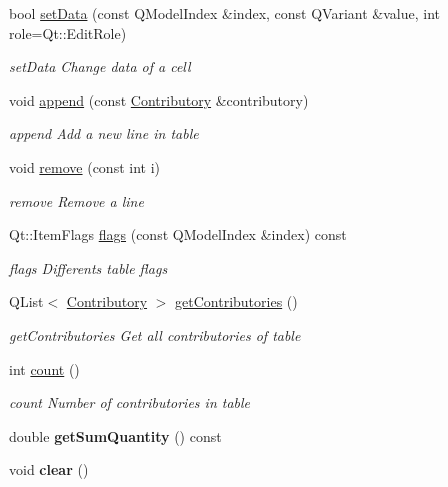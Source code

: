 \begin{DoxyCompactItemize}
bool \hyperlink{classGui_1_1Widgets_1_1WdgModels_1_1ContributoriesTableModel_a1c9f7969dc52e5840acfc122fcb2ab48}{set\-Data} (const Q\-Model\-Index \&index, const Q\-Variant \&value, int role=Qt\-::\-Edit\-Role)
\begin{DoxyCompactList}\small\item\em set\-Data Change data of a cell \end{DoxyCompactList}\item 
void \hyperlink{classGui_1_1Widgets_1_1WdgModels_1_1ContributoriesTableModel_a6d3f0ab976abd9993b731b27fbe3a404}{append} (const \hyperlink{classModels_1_1Contributory}{Contributory} \&contributory)
\begin{DoxyCompactList}\small\item\em append Add a new line in table \end{DoxyCompactList}\item 
void \hyperlink{classGui_1_1Widgets_1_1WdgModels_1_1ContributoriesTableModel_a76666bbbc940867b6ff3366424f72e26}{remove} (const int i)
\begin{DoxyCompactList}\small\item\em remove Remove a line \end{DoxyCompactList}\item 
Qt\-::\-Item\-Flags \hyperlink{classGui_1_1Widgets_1_1WdgModels_1_1ContributoriesTableModel_a6bf3e8c45bb499e82546be456a7de77b}{flags} (const Q\-Model\-Index \&index) const 
\begin{DoxyCompactList}\small\item\em flags Differents table flags \end{DoxyCompactList}\item 
Q\-List$<$ \hyperlink{classModels_1_1Contributory}{Contributory} $>$ \hyperlink{classGui_1_1Widgets_1_1WdgModels_1_1ContributoriesTableModel_af20bc21f24f7597b6b7d053d11d02d97}{get\-Contributories} ()
\begin{DoxyCompactList}\small\item\em get\-Contributories Get all contributories of table \end{DoxyCompactList}\item 
int \hyperlink{classGui_1_1Widgets_1_1WdgModels_1_1ContributoriesTableModel_acc01a97c00bb57e6733f697fc45be0ed}{count} ()
\begin{DoxyCompactList}\small\item\em count Number of contributories in table \end{DoxyCompactList}\item 
\hypertarget{classGui_1_1Widgets_1_1WdgModels_1_1ContributoriesTableModel_ac62bb6714ddcccb0ed2bfb2babb4c075}{double {\bfseries get\-Sum\-Quantity} () const }\label{classGui_1_1Widgets_1_1WdgModels_1_1ContributoriesTableModel_ac62bb6714ddcccb0ed2bfb2babb4c075}

\item 
\hypertarget{classGui_1_1Widgets_1_1WdgModels_1_1ContributoriesTableModel_aa7854991b9d25db6c3eb55b638f81d6d}{void {\bfseries clear} ()}\label{classGui_1_1Widgets_1_1WdgModels_1_1ContributoriesTableModel_aa7854991b9d25db6c3eb55b638f81d6d}

\end{DoxyCompactItemize}


